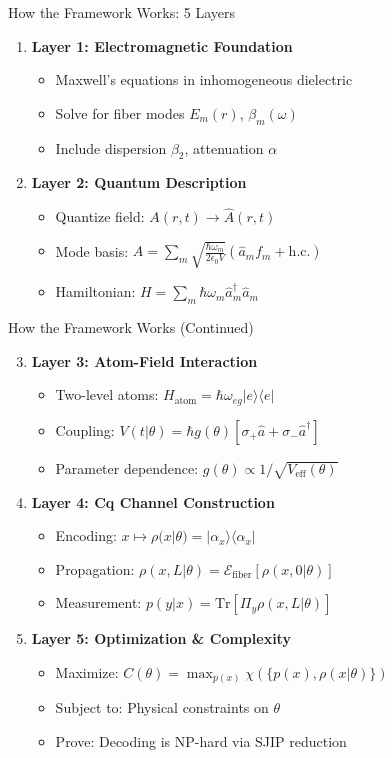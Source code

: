\documentclass[10pt]{beamer}
\begin{document}
\begin{frame}{How the Framework Works: 5 Layers}
\begin{enumerate}
\item \textbf{Layer 1: Electromagnetic Foundation}
\begin{itemize}
\item Maxwell's equations in inhomogeneous dielectric
\item Solve for fiber modes $E_m(r)$, $\beta_m(\omega)$
\item Include dispersion $\beta_2$, attenuation $\alpha$
\end{itemize}

\item \textbf{Layer 2: Quantum Description}
\begin{itemize}
\item Quantize field: $A(r,t) \to \hat{A}(r,t)$
\item Mode basis: $\hat{A} = \sum_m \sqrt{\frac{\hbar\omega_m}{2\epsilon_0 V}}(\hat{a}_m f_m + \text{h.c.})$
\item Hamiltonian: $H = \sum_m \hbar\omega_m \hat{a}_m^\dagger \hat{a}_m$
\end{itemize}
\end{enumerate}
\end{frame}

\begin{frame}{How the Framework Works (Continued)}
\begin{enumerate}
\setcounter{enumi}{2}
\item \textbf{Layer 3: Atom-Field Interaction}
\begin{itemize}
\item Two-level atoms: $H_{\text{atom}} = \hbar\omega_{eg}|e\rangle\langle e|$
\item Coupling: $V(t|\theta) = \hbar g(\theta)[\sigma_+ \hat{a} + \sigma_- \hat{a}^\dagger]$
\item Parameter dependence: $g(\theta) \propto 1/\sqrt{V_{\text{eff}}(\theta)}$
\end{itemize}

\item \textbf{Layer 4: Cq Channel Construction}
\begin{itemize}
\item Encoding: $x \mapsto \rho(x|\theta) = |\alpha_x\rangle\langle\alpha_x|$
\item Propagation: $\rho(x,L|\theta) = \mathcal{E}_{\text{fiber}}[\rho(x,0|\theta)]$
\item Measurement: $p(y|x) = \text{Tr}[\Pi_y \rho(x,L|\theta)]$
\end{itemize}

\item \textbf{Layer 5: Optimization \& Complexity}
\begin{itemize}
\item Maximize: $C(\theta) = \max_{p(x)} \chi(\{p(x), \rho(x|\theta)\})$
\item Subject to: Physical constraints on $\theta$
\item Prove: Decoding is NP-hard via SJIP reduction
\end{itemize}
\end{enumerate}
\end{frame}
\end{document}
